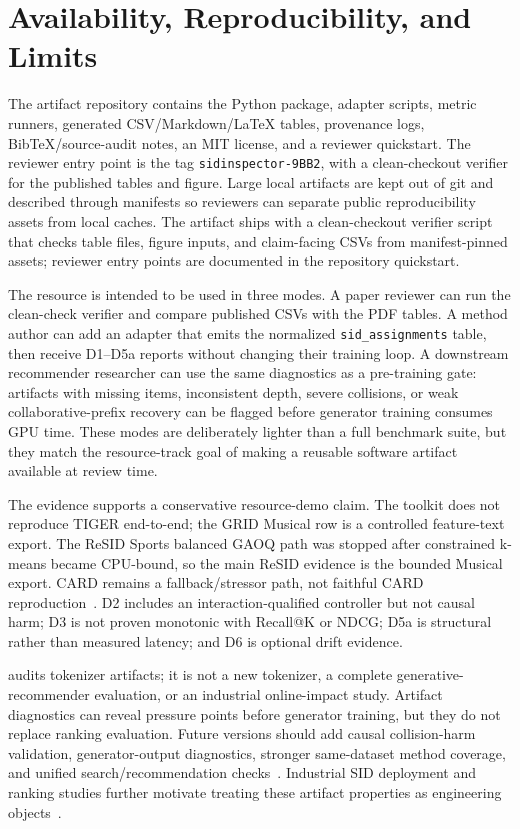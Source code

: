 \section{Availability, Reproducibility, and Limits}

The artifact repository contains the \tool Python package, adapter scripts,
metric runners, generated CSV/Markdown/\LaTeX{} tables, provenance logs,
BibTeX/source-audit notes, an MIT license, and a reviewer quickstart. The
reviewer entry point is the tag
\texttt{sidinspector-9BB2}, with a clean-checkout verifier for the
published tables and figure. Large local artifacts are kept out of git and
described through manifests so reviewers can separate public reproducibility
assets from local caches.
The artifact ships with a clean-checkout verifier script that checks table
files, figure inputs, and claim-facing CSVs from manifest-pinned assets;
reviewer entry points are documented in the repository quickstart.

The resource is intended to be used in three modes. A paper reviewer can run
the clean-check verifier and compare published CSVs with the PDF tables. A
method author can add an adapter that emits the normalized
\texttt{sid\_assignments} table, then receive D1--D5a reports without changing
their training loop. A downstream recommender researcher can use the same
diagnostics as a pre-training gate: artifacts with missing items, inconsistent
depth, severe collisions, or weak collaborative-prefix recovery can be flagged
before generator training consumes GPU time. These modes are deliberately
lighter than a full benchmark suite, but they match the resource-track goal of
making a reusable software artifact available at review time.

The evidence supports a conservative resource-demo claim. The toolkit does not
reproduce TIGER end-to-end; the GRID Musical row is a controlled feature-text
export. The ReSID Sports balanced GAOQ path was stopped after constrained
k-means became CPU-bound, so the main ReSID evidence is the bounded Musical
export. CARD remains a fallback/stressor path, not faithful CARD
reproduction~\cite{wei2026card}. D2 includes an interaction-qualified
controller but not causal harm; D3 is not proven monotonic with Recall@K or
NDCG; D5a is structural rather than measured latency; and D6 is optional drift
evidence.

\tool audits tokenizer artifacts; it is not a new \sid tokenizer, a complete
generative-recommender evaluation, or an industrial online-impact study.
Artifact diagnostics can reveal pressure points before generator training, but
they do not replace ranking evaluation. Future versions should add causal
collision-harm validation, generator-output diagnostics, stronger same-dataset
method coverage, and unified search/recommendation checks~\cite{li2024survey,penha2025jointsid}.
Industrial SID deployment and ranking studies further motivate treating these
artifact properties as engineering objects~\cite{singh2023bettersemanticids,li2026sidcoord,ju2026snapchatsid}.

